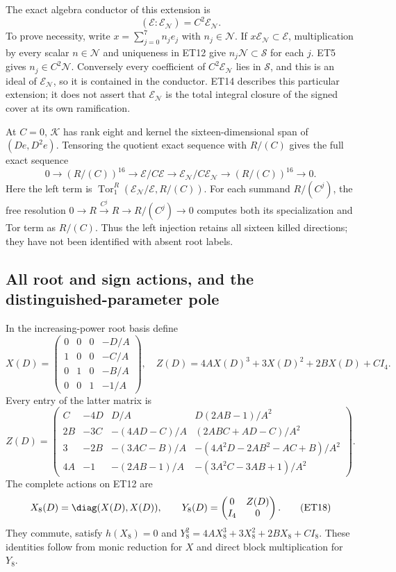 The exact algebra conductor of this extension is
\[
 (\mathscr E:\mathscr E_{\mathscr N})=C^2\mathscr E_{\mathscr N}.
 \tag{ET14}
\]
To prove necessity, write $x=\sum_{j=0}^7 n_j e_j$ with $n_j\in\mathscr N$.
If $x\mathscr E_{\mathscr N}\subset\mathscr E$, multiplication by every
scalar $n\in\mathscr N$ and uniqueness in ET12 give
$n_j\mathscr N\subset\mathscr S$ for each $j$. ET5 gives
$n_j\in C^2\mathscr N$. Conversely every coefficient of
$C^2\mathscr E_{\mathscr N}$ lies in $\mathscr S$, and this is an
ideal of $\mathscr E_{\mathscr N}$, so it is contained in the conductor.
ET14 describes this particular extension; it does not assert that
$\mathscr E_{\mathscr N}$ is the total integral closure of the signed
cover at its own ramification.

At $C=0$, $\mathcal K$ has rank eight and kernel the sixteen-dimensional
span of $(De,D^2e)$. Tensoring the quotient exact sequence with $R/(C)$
gives the full exact sequence
\[
 0\longrightarrow (R/(C))^{16}\longrightarrow
 \mathscr E/C\mathscr E\longrightarrow
 \mathscr E_{\mathscr N}/C\mathscr E_{\mathscr N}
 \longrightarrow(R/(C))^{16}\longrightarrow0 .
 \tag{ET15}
\]
Here the left term is $\operatorname{Tor}_1^R(
 \mathscr E_{\mathscr N}/\mathscr E,R/(C))$.
For each summand $R/(C^j)$, the free resolution
$0\to R\xrightarrow{C^j}R\to R/(C^j)\to0$
computes both its specialization and Tor term as $R/(C)$.
Thus the left injection retains all sixteen killed directions;
they have not been identified with absent root labels.

\subsection{All root and sign actions, and the distinguished-parameter pole}
In the increasing-power root basis define
\[
 X(D)=\begin{pmatrix}
 0&0&0&-D/A\\1&0&0&-C/A\\0&1&0&-B/A\\0&0&1&-1/A
 \end{pmatrix},\quad
 Z(D)=4AX(D)^3+3X(D)^2+2BX(D)+CI_4.
 \tag{ET16}
\]
Every entry of the latter matrix is
\[
 Z(D)=\begin{pmatrix}
 C&-4D&D/A&D(2AB-1)/A^2\\
 2B&-3C&-(4AD-C)/A&(2ABC+AD-C)/A^2\\
 3&-2B&-(3AC-B)/A&-(4A^2D-2AB^2-AC+B)/A^2\\
 4A&-1&-(2AB-1)/A&-(3A^2C-3AB+1)/A^2
 \end{pmatrix}.
 \tag{ET17}
\]
The complete actions on ET12 are
\[
 X_8(D)=\diag(X(D),X(D)),\qquad
 Y_8(D)=\begin{pmatrix}0&Z(D)\\I_4&0\end{pmatrix}.
 \tag{ET18}
\]
They commute, satisfy $h(X_8)=0$ and
$Y_8^2=4AX_8^3+3X_8^2+2BX_8+CI_8$.
These identities follow from monic reduction for $X$ and direct block
multiplication for $Y_8$.

